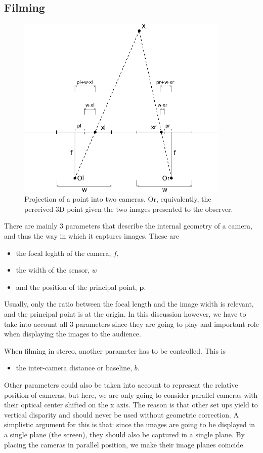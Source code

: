 \documentclass[12pt,a4paper]{article}
\def\p{\mathbf p}
\begin{document}
\subsection{Filming}
\begin{figure}
 \begin{center}
  \includegraphics[width=0.9\textwidth]{stereo_projection.pdf}
 \end{center}
 \caption{Projection of a point into two cameras.  Or, equivalently, the perceived 3D point given the two images presented to the observer.}
\end{figure}


There are mainly 3 parameters that describe the internal geometry of a camera, and thus the way in which it captures images.  These are
\begin{itemize}
 \item the focal leghth of the camera, $f$,
 \item the width of the sensor, $w$
 \item and the position of the principal point, $\p$.
\end{itemize}
Usually, only the ratio between the focal length and the image width is relevant, and the principal point is at the origin.  In this discussion however, we have to take into account all 3 parameters since they are going to play and important role when displaying the images to the audience.

When filming in stereo, another parameter has to be controlled.  This is
\begin{itemize}
 \item the inter-camera distance or baseline, $b$.
\end{itemize}
Other parameters could also be taken into account to represent the relative position of cameras, but here, we are only going to consider parallel cameras with their optical center shifted on the x axis.  The reason is that other set ups yield to vertical disparity and should never be used without geometric correction.  A simplistic argument for this is that: since the images are going to be displayed in a single plane (the screen), they should also be captured in a single plane.  By placing the cameras in parallel position, we make their image planes coincide.
\end{document}
